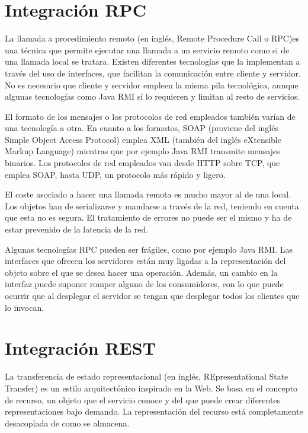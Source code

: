 \documentclass[11pt,a4paper]{article}
\begin{document}
\section{Integración RPC}

La llamada a procedimiento remoto (en inglés, Remote Procedure Call o RPC)es una técnica que permite ejecutar una llamada a un servicio remoto como si de una llamada local se tratara. Existen diferentes tecnologías que la implementan a través del uso de interfaces, que facilitan la comunicación entre cliente y servidor. No es necesario que cliente y servidor empleen la misma pila tecnológica, aunque algunas tecnologías como Java RMI sí lo requieren y limitan al resto de servicios.

El formato de los mensajes o los protocolos de red empleados también varían de una tecnología a otra. En cuanto a los formatos, SOAP (proviene del inglés Simple Object Access Protocol) emplea XML (también del inglés eXtensible Markup Language) mientras que por ejemplo Java RMI transmite mensajes binarios. Los protocoles de red empleados van desde HTTP sobre TCP, que emplea SOAP, hasta UDP, un protocolo más rápido y ligero.

El coste asociado a hacer una llamada remota es mucho mayor al de una local. Los objetos han de serializarse y mandarse a través de la red, teniendo en cuenta que esta no es segura. El tratamiento de errores no puede ser el mismo y ha de estar prevenido de la latencia de la red.

Algunas tecnologías RPC pueden ser frágiles, como por ejemplo Java RMI. Las interfaces que ofrecen los servidores están muy ligadas a la representación del objeto sobre el que se desea hacer una operación. Además, un cambio en la interfaz puede suponer romper alguno de los consumidores,  con lo que puede ocurrir que al desplegar el servidor se tengan que desplegar todos los clientes que lo invocan.

\section{Integración REST}

La transferencia de estado representacional (en inglés, REpresentational State Transfer) es un estilo arquitectónico inspirado en la Web. Se basa en el concepto de recurso, un objeto que el servicio conoce y del que puede crear diferentes representaciones bajo demando. La representación del recurso está completamente desacoplada de como se almacena.
\end{document}
